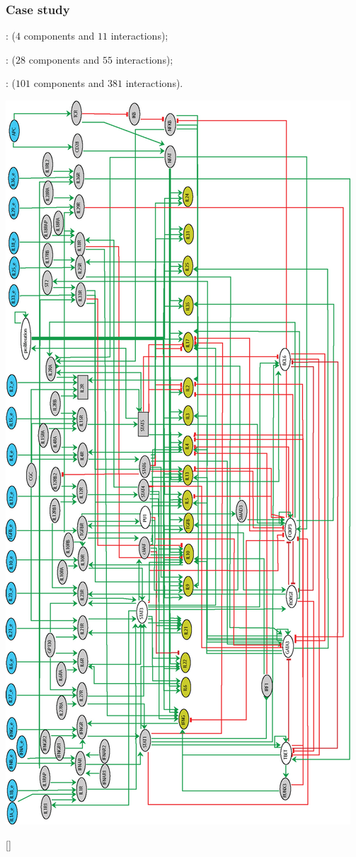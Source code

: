 
\begin{frame}[c]
 \frametitle{Case study}
 

 : ($4$  components and $11$  interactions); 

 : ($28$  components and $55$  interactions); 

: ($101$  components and $381$  interactions).

\begin{center}
  \includegraphics[scale=0.18,angle=-90]{images/th_differentiation.jpg}
\end{center}
\begin{center}
 {\tiny \color{darkgreen} [\citeatfb]}
\end{center}
\end{frame}



